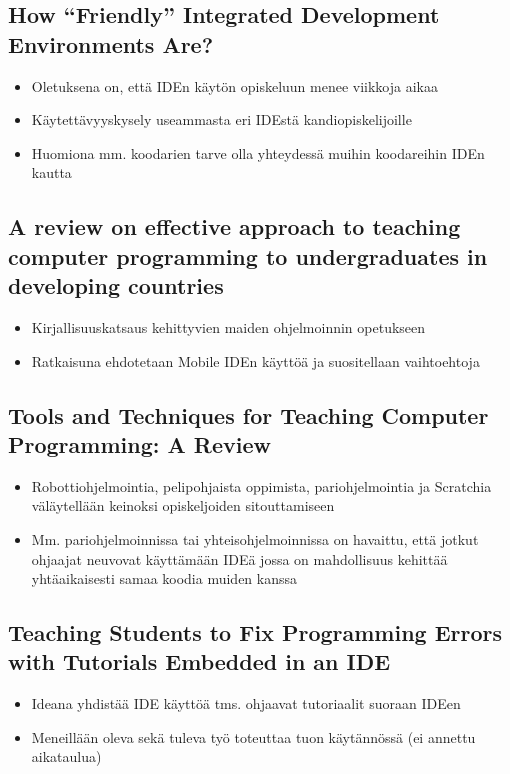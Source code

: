 \documentclass[11pt]{article}
\begin{document}
\subsection{How ``Friendly'' Integrated Development Environments Are?}
\begin{itemize}
\item Oletuksena on, että IDEn käytön opiskeluun menee viikkoja aikaa
\item Käytettävyyskysely useammasta eri IDEstä kandiopiskelijoille
\item Huomiona mm. koodarien tarve olla yhteydessä muihin koodareihin
  IDEn kautta
\end{itemize}

\subsection{A review on effective approach to teaching computer programming to undergraduates in developing countries}
\begin{itemize}
\item Kirjallisuuskatsaus kehittyvien maiden ohjelmoinnin opetukseen
\item Ratkaisuna ehdotetaan Mobile IDEn käyttöä ja suositellaan
  vaihtoehtoja 
\end{itemize}

\subsection{Tools and Techniques for Teaching Computer Programming: A Review}
\begin{itemize}
\item Robottiohjelmointia, pelipohjaista oppimista, pariohjelmointia ja Scratchia väläytellään
  keinoksi opiskeljoiden sitouttamiseen
\item Mm. pariohjelmoinnissa tai yhteisohjelmoinnissa on havaittu, että
  jotkut ohjaajat neuvovat käyttämään IDEä jossa on mahdollisuus
  kehittää yhtäaikaisesti samaa koodia muiden kanssa
\end{itemize}

\subsection{Teaching Students to Fix Programming Errors with Tutorials Embedded in an IDE}
\begin{itemize}
\item Ideana yhdistää IDE käyttöä tms. ohjaavat tutoriaalit suoraan
  IDEen
\item Meneillään oleva sekä tuleva työ toteuttaa tuon käytännössä (ei annettu aikataulua)
\end{itemize}
\end{document}
